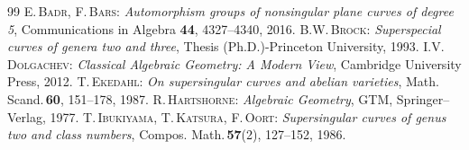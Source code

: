 \documentclass[10pt,a4paper]{amsart}
\begin{document}
\vfill
\begin{thebibliography}{99}\vspace{-1mm}
 \textsc{E.\,Badr, F\hspace{-0.2mm}.\,Bars}: \textit{Automorphism groups of nonsingular plane curves of degree 5}, Communications in Algebra {\bf 44}, 4327--4340, 2016.\vspace{-1mm}
 \textsc{B.\hspace{0.3mm}W\hspace{-0.4mm}.\,Brock}: \textit{Superspecial curves of genera two and three}, Thesis (Ph.D.)-Princeton \hspace{-0.2mm}University, 1993.\vspace{-1mm}
 \textsc{I.\hspace{0.4mm}V\hspace{-0.3mm}.\,Dolgachev}: \textit{Classical Algebraic Geometry: \hspace{-0.2mm}A \hspace{-0.2mm}Modern \hspace{-0.2mm}View}, \hspace{0.2mm}Cambridge University Press, 2012.\vspace{-1mm}
 \textsc{T.\,Ekedahl}: \textit{On supersingular curves and abelian varieties}, Math.\,Scand.\,{\bf 60}, 151--178, 1987.\vspace{-1mm}
 \textsc{R.\,Hartshorne}: \textit{Algebraic Geometry}, GTM\hspace{0.7mm}{\bf 52}, Springer--Verlag, 1977.\vspace{-1mm}
 \textsc{T\hspace{-0.2mm}.\,Ibukiyama, \hspace{-0.2mm}T\hspace{-0.2mm}.\,Katsura, F.\,Oort}: \textit{Supersingular curves of genus two and class numbers}, Compos. Math.\,{\bf 57}(2), 127--152, 1986.\vspace{-1mm}

\end{thebibliography}
\end{document}
